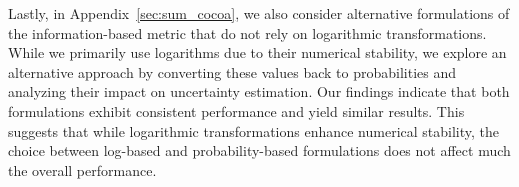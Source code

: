  Lastly, in Appendix~\ref{sec:sum_cocoa}, we also consider alternative formulations of the information-based metric that do not rely on logarithmic transformations. While we primarily use logarithms due to their numerical stability, we explore an alternative approach by converting these values back to probabilities and analyzing their impact on uncertainty estimation. Our findings indicate that both formulations exhibit consistent performance and yield similar results. This suggests that while logarithmic transformations enhance numerical stability, the choice between log-based and probability-based formulations does not affect much the overall performance.

